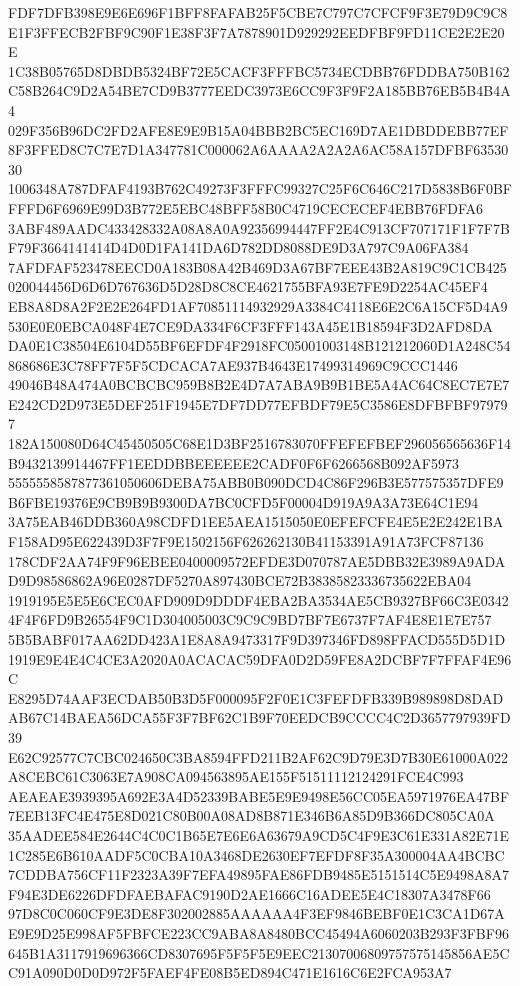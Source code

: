 \documentclass[UTF8,fontset=fandol,zihao=-4,a4paper]{ctexart}
\begin{document}
{{FDF7DFB398E9E6E696F1BFF8FAFAB25F5CBE7C797C7CFCF9F3E79D9C9C8E1F3FFECB2FBF9C90F1E38F3F7A7878901D929292EEDFBF9FD11CE2E2E20E
1C38B05765D8DBDB5324BF72E5CACF3FFFBC5734ECDBB76FDDBA750B162C58B264C9D2A54BE7CD9B3777EEDC3973E6CC9F3F9F2A185BB76EB5B4B4A4
029F356B96DC2FD2AFE8E9E9B15A04BBB2BC5EC169D7AE1DBDDEBB77EF8F3FFED8C7C7E7D1A347781C000062A6AAAA2A2A2A6AC58A157DFBF6353030
1006348A787DFAF4193B762C49273F3FFFC99327C25F6C646C217D5838B6F0BFFFFD6F6969E99D3B772E5EBC48BFF58B0C4719CECECEF4EBB76FDFA6
3ABF489AADC433428332A08A8A0A92356994447FF2E4C913CF707171F1F7F7BF79F3664141414D4D0D1FA141DA6D782DD8088DE9D3A797C9A06FA384
7AFDFAF523478EECD0A183B08A42B469D3A67BF7EEE43B2A819C9C1CB425020044456D6D6D767636D5D28D8C8CE4621755BFA93E7FE9D2254AC45EF4
EB8A8D8A2F2E2E264FD1AF70851114932929A3384C4118E6E2C6A15CF5D4A9530E0E0EBCA048F4E7CE9DA334F6CF3FFF143A45E1B18594F3D2AFD8DA
DA0E1C38504E6104D55BF6EFDF4F2918FC05001003148B121212060D1A248C54868686E3C78FF7F5F5CDCACA7AE937B4643E17499314969C9CCC1446
49046B48A474A0BCBCBC959B8B2E4D7A7ABA9B9B1BE5A4AC64C8EC7E7E7E242CD2D973E5DEF251F1945E7DF7DD77EFBDF79E5C3586E8DFBFBF979797
182A150080D64C45450505C68E1D3BF2516783070FFEFEFBEF296056565636F14B9432139914467FF1EEDDBBEEEEEE2CADF0F6F6266568B092AF5973
5555558587877361050606DEBA75ABB0B090DCD4C86F296B3E577575357DFE9B6FBE19376E9CB9B9B9300DA7BC0CFD5F00004D919A9A3A73E64C1E94
3A75EAB46DDB360A98CDFD1EE5AEA1515050E0EFEFCFE4E5E2E242E1BAF158AD95E622439D3F7F9E1502156F626262130B41153391A91A73FCF87136
178CDF2AA74F9F96EBEE0400009572EFDE3D070787AE5DBB32E3989A9ADAD9D98586862A96E0287DF5270A897430BCE72B38385823336735622EBA04
1919195E5E5E6CEC0AFD909D9DDDF4EBA2BA3534AE5CB9327BF66C3E03424F4F6FD9B26554F9C1D304005003C9C9C9BD7BF7E6737F7AF4E8E1E7E757
5B5BABF017AA62DD423A1E8A8A9473317F9D397346FD898FFACD555D5D1D1919E9E4E4C4CE3A2020A0ACACAC59DFA0D2D59FE8A2DCBF7F7FFAF4E96C
E8295D74AAF3ECDAB50B3D5F000095F2F0E1C3FEFDFB339B989898D8DADAB67C14BAEA56DCA55F3F7BF62C1B9F70EEDCB9CCCC4C2D3657797939FD39
E62C92577C7CBC024650C3BA8594FFD211B2AF62C9D79E3D7B30E61000A022A8CEBC61C3063E7A908CA094563895AE155F51511112124291FCE4C993
AEAEAE3939395A692E3A4D52339BABE5E9E9498E56CC05EA5971976EA47BF7EEB13FC4E475E8D021C80B00A08AD8B871E346B6A85D9B366DC805CA0A
35AADEE584E2644C4C0C1B65E7E6E6A63679A9CD5C4F9E3C61E331A82E71E1C285E6B610AADF5C0CBA10A3468DE2630EF7EFDF8F35A300004AA4BCBC
7CDDBA756CF11F2323A39F7EFA49895FAE86FDB9485E5151514C5E9498A8A7F94E3DE6226DFDFAEBAFAC9190D2AE1666C16ADEE5E4C18307A3478F66
97D8C0C060CF9E3DE8F302002885AAAAAA4F3EF9846BEBF0E1C3CA1D67AE9E9D25E998AF5FBFCE223CC9ABA8A8480BCC45494A6060203B293F3FBF96
645B1A3117919696366CD8307695F5F5F5E9EEC21307006809757575145856AE5CC91A090D0D0D972F5FAEF4FE08B5ED894C471E1616C6E2FCA953A7
}}
\end{document}
